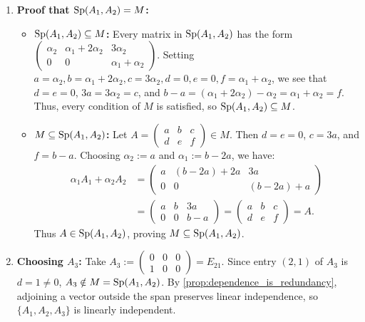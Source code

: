 \begin{exercisesolution}
\begin{enumerate}[label=\textbf{(\alph*)}]
    \item \textbf{Proof that $\operatorname{Sp}(A_1, A_2) = M$:}
    \begin{itemize}
        \item \textbf{$\operatorname{Sp}(A_1, A_2) \subseteq M$:} Every matrix in $\operatorname{Sp}(A_1, A_2)$ has the form $\left(\begin{smallmatrix} \alpha_2 & \alpha_1 + 2\alpha_2 & 3\alpha_2 \\ 0 & 0 & \alpha_1 + \alpha_2 \end{smallmatrix}\right)$. Setting $a = \alpha_2, b = \alpha_1 + 2\alpha_2, c = 3\alpha_2, d = 0, e = 0, f = \alpha_1 + \alpha_2$, we see that $d = e = 0$, $3a = 3\alpha_2 = c$, and $b - a = (\alpha_1 + 2\alpha_2) - \alpha_2 = \alpha_1 + \alpha_2 = f$. Thus, every condition of $M$ is satisfied, so $\operatorname{Sp}(A_1, A_2) \subseteq M$.
        \item \textbf{$M \subseteq \operatorname{Sp}(A_1, A_2)$:} Let $A = \left(\begin{smallmatrix} a & b & c \\ d & e & f \end{smallmatrix}\right) \in M$. Then $d = e = 0$, $c = 3a$, and $f = b - a$. Choosing $\alpha_2 := a$ and $\alpha_1 := b - 2a$, we have:
        \begin{align*}
        \alpha_1 A_1 + \alpha_2 A_2 &= \begin{pmatrix} a & (b - 2a) + 2a & 3a \\ 0 & 0 & (b - 2a) + a \end{pmatrix} \\
        &= \begin{pmatrix} a & b & 3a \\ 0 & 0 & b - a \end{pmatrix} = \begin{pmatrix} a & b & c \\ d & e & f \end{pmatrix} = A.
        \end{align*}
        Thus $A \in \operatorname{Sp}(A_1, A_2)$, proving $M \subseteq \operatorname{Sp}(A_1, A_2)$.
    \end{itemize}

    \item \textbf{Choosing $A_3$:}
    Take $A_3 := \left(\begin{smallmatrix} 0 & 0 & 0 \\ 1 & 0 & 0 \end{smallmatrix}\right) = E_{21}$.
    Since entry $(2, 1)$ of $A_3$ is $d = 1 \ne 0$, $A_3 \notin M = \operatorname{Sp}(A_1, A_2)$. By \cref{prop:dependence_is_redundancy}, adjoining a vector outside the span preserves linear independence, so $\{A_1, A_2, A_3\}$ is linearly independent.
    

\end{enumerate}
\end{exercisesolution}
